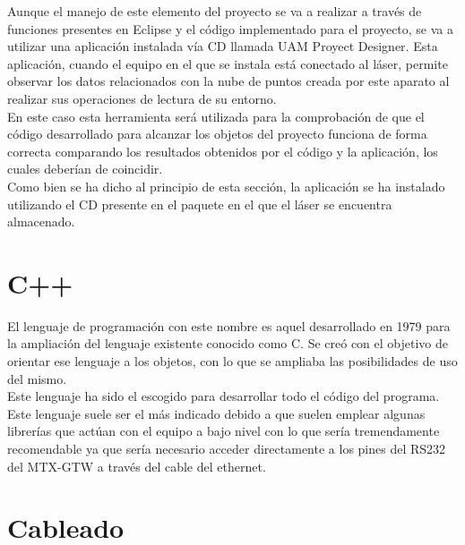 Aunque el manejo de este elemento del proyecto se va a realizar a través de funciones presentes en Eclipse y el código implementado para el proyecto, se va a utilizar una aplicación instalada vía CD llamada UAM Proyect Designer. Esta aplicación, cuando el equipo en el que se instala está conectado al láser, permite observar los datos relacionados con la nube de puntos creada por este aparato al realizar sus operaciones de lectura de su entorno.\\
En este caso esta herramienta será utilizada para la comprobación de que el código desarrollado para alcanzar los objetos del proyecto funciona de forma correcta comparando los resultados obtenidos por el código y la aplicación, los cuales deberían de coincidir.\\
Como bien se ha dicho al principio de esta sección, la aplicación se ha instalado utilizando el CD presente en el paquete en el que el láser se encuentra almacenado. 

\section{C++}

El lenguaje de programación con este nombre es aquel desarrollado en 1979 para la ampliación del lenguaje existente conocido como C. Se creó con el objetivo de orientar ese lenguaje a los objetos, con lo que se ampliaba las posibilidades de uso del mismo.\\
Este lenguaje ha sido el escogido para desarrollar todo el código del programa. Este lenguaje suele ser el más indicado debido a que suelen emplear algunas librerías que actúan con el equipo a bajo nivel con lo que sería tremendamente recomendable ya que sería necesario acceder directamente a los pines del RS232 del MTX-GTW a través del cable del ethernet.

\section{Cableado}

